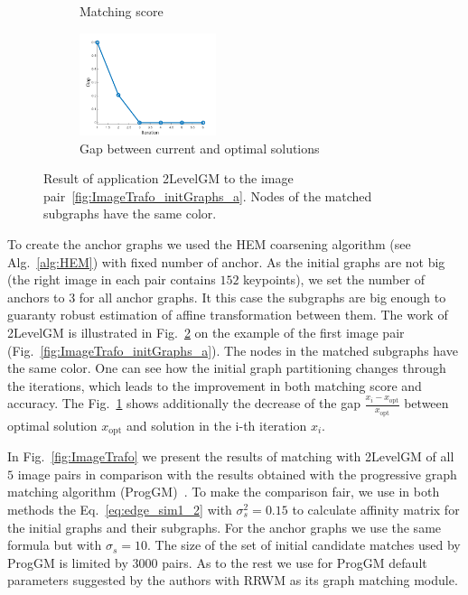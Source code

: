 \begin{figure}
\begin{subfigure}[b]{0.33\textwidth}
			\caption{Matching score}
		\end{subfigure}
		\begin{subfigure}[b]{0.3\textwidth}
			\centering
			\includegraphics[width=4cm]{"chapter3/fig/ImageTrafo/sIterations/gap"}
			\caption{Gap between current and optimal solutions}
			\label{fig:ImageTrafo_sIterations_f}
		\end{subfigure} 	
	\caption[Result of application 2LevelGM to the image pair~\ref{fig:ImageTrafo_initGraphs_a}]{Result of application 2LevelGM to the image pair~\ref{fig:ImageTrafo_initGraphs_a}. Nodes of the matched subgraphs have the same color.}
	\label{fig:ImageTrafo_sIterations}
\end{figure}

To create the anchor graphs we used the HEM coarsening algorithm (see Alg.~\ref{alg:HEM}) with fixed number of anchor. As the initial graphs are not big (the right image in each pair contains $152$ keypoints), we set the number of anchors to $3$ for all anchor graphs. It this case the subgraphs are big enough to guaranty robust estimation of affine transformation between them. The work of 2LevelGM is illustrated in Fig.~\ref{fig:ImageTrafo_sIterations} on the example of the first image pair (Fig.~\ref{fig:ImageTrafo_initGraphs_a}). The nodes in the matched subgraphs have the same color. One can see how the initial graph partitioning changes through the iterations, which leads to the improvement in both matching score and accuracy. The Fig.~\ref{fig:ImageTrafo_sIterations_f} shows additionally the decrease of the gap $\frac{x_i-x_{\text{opt}}}{x_{\text{opt}}}$ between optimal solution $x_{\text{opt}}$ and solution in the i-th iteration $x_i$. 

In Fig.~\ref{fig:ImageTrafo} we present the results of matching with 2LevelGM of all $5$ image pairs in comparison with the results obtained with the progressive graph matching algorithm (ProgGM)~\cite{Cho2012_ProgressiveGM}.  To make the comparison fair, we use in both methods the Eq.~\eqref{eq:edge_sim1_2} with $\sigma_s^2=0.15$ to calculate affinity matrix for the initial graphs and their subgraphs. For the anchor graphs we use the same formula but with $\sigma_s=10$. The size of the set of initial candidate matches used by ProgGM is limited by $3000$ pairs. As to the rest we use for ProgGM default parameters suggested by the authors with RRWM as its graph matching module.


